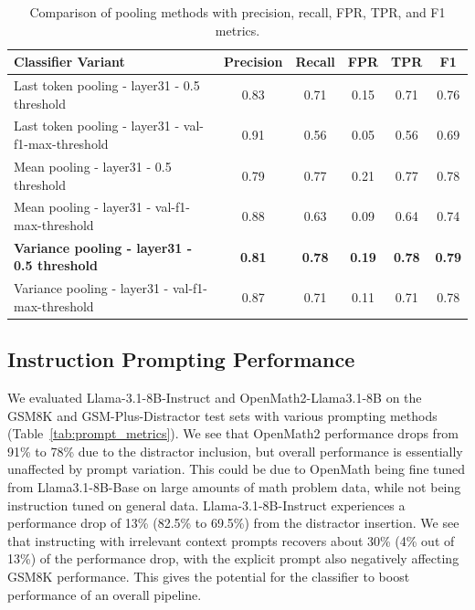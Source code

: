 \documentclass{article}
\begin{document}

\begin{table}[h!]
    \centering
    \begin{tabular}{l c c c c c}
        \toprule
        \textbf{Classifier Variant} & \textbf{Precision} & \textbf{Recall} & \textbf{FPR} & \textbf{TPR} & \textbf{F1} \\
        \midrule
        Last token pooling - layer31 - 0.5 threshold & 0.83 & 0.71 & 0.15 & 0.71 & 0.76\\
        Last token pooling - layer31 - val-f1-max-threshold & 0.91 & 0.56 & 0.05 & 0.56 & 0.69\\
        Mean pooling - layer31 - 0.5 threshold & 0.79 & 0.77 & 0.21 & 0.77 & 0.78 \\
        Mean pooling - layer31 - val-f1-max-threshold & 0.88 & 0.63 & 0.09 & 0.64 & 0.74 \\
        \textbf{Variance pooling - layer31 - 0.5 threshold} & \textbf{0.81} & \textbf{0.78} & \textbf{0.19} & \textbf{0.78} & \textbf{0.79} \\
        Variance pooling - layer31 - val-f1-max-threshold & 0.87 & 0.71 & 0.11 & 0.71 & 0.78 \\
        \bottomrule
    \end{tabular}
    \caption{Comparison of pooling methods with precision, recall, FPR, TPR, and F1 metrics.}
    \label{tab:classifier_metrics}
\end{table}

\subsection{Instruction Prompting Performance}
We evaluated Llama-3.1-8B-Instruct and OpenMath2-Llama3.1-8B on the GSM8K and GSM-Plus-Distractor test sets with various prompting methods (Table~\ref{tab:prompt_metrics}). We see that OpenMath2 performance drops from 91\% to 78\% due to the distractor inclusion, but overall performance is essentially unaffected by prompt variation. This could be due to OpenMath being fine tuned from Llama3.1-8B-Base on large amounts of math problem data, while not being instruction tuned on general data. Llama-3.1-8B-Instruct experiences a performance drop of 13\% (82.5\% to 69.5\%) from the distractor insertion. We see that instructing with irrelevant context prompts recovers about 30\% (4\% out of 13\%) of the performance drop, with the explicit prompt also negatively affecting GSM8K performance. This gives the potential for the classifier to boost performance of an overall pipeline.
\end{document}
